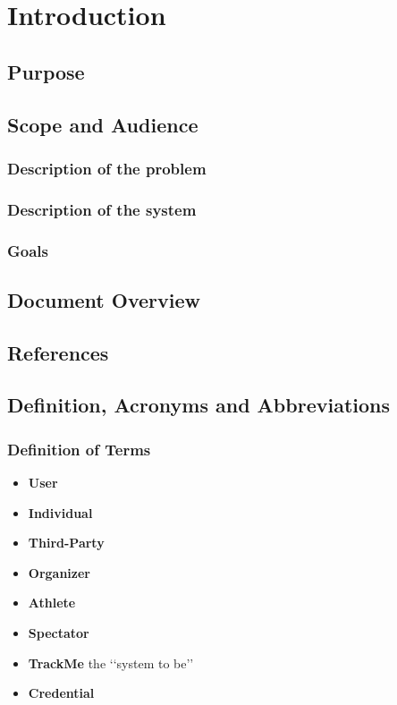 \documentclass[a4paper]{article}
\begin{document}

\tableofcontents
\newpage
\listoffigures
\newpage
\listoftables
\newpage
\section{Introduction}

    \subsection{Purpose}
    
    \subsection{Scope and Audience}
        \subsubsection{Description of the problem}
        
        \subsubsection{Description of the system}
        
        \subsubsection{Goals}
    
    \subsection{Document Overview}
    
    \subsection{References}
        \printbibliography
    
    \subsection{Definition, Acronyms and  Abbreviations}
            
            \subsubsection{Definition of Terms}
                \begin{itemize}
                    \item \textbf{User}
                    \item \textbf{Individual}
                    \item \textbf{Third-Party}
                    \item \textbf{Organizer}
                    \item \textbf{Athlete}
                    \item \textbf{Spectator}
                    \item \textbf{TrackMe} the \lq\lq system to be\rq\rq
                    \item \textbf{Credential}
                \end{itemize}
\end{document}
